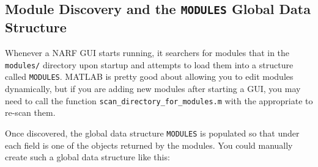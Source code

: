 \documentclass[letterpaper]{report}
\newcommand{\matlab}[1]{\texttt{#1}}
\begin{document}
\subsection{Module Discovery and the \matlab{MODULES} Global Data Structure}

Whenever a NARF GUI starts running, it searchers for modules that in the \matlab{modules/} directory upon startup and attempts to load them into a structure called \matlab{MODULES}. MATLAB is pretty good about allowing you to edit modules dynamically, but if you are adding new modules after starting a GUI, you may need to call the function \matlab{scan\_directory\_for\_modules.m} with the appropriate to re-scan them. 

Once discovered, the global data structure \matlab{MODULES} is populated so that under each field is one of the objects returned by the modules. You could manually create such a global data structure like this:
\end{document}
